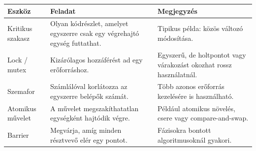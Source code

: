
\begin{tabularx}{\textwidth}{L{30mm}X X}
\toprule
\textbf{Eszköz} & \textbf{Feladat} & \textbf{Megjegyzés} \\
\midrule
Kritikus szakasz & Olyan kódrészlet, amelyet egyszerre csak egy végrehajtó egység futtathat. & Tipikus példa: közös változó módosítása. \\
Lock / mutex & Kizárólagos hozzáférést ad egy erőforráshoz. & Egyszerű, de holtpontot vagy várakozást okozhat rossz használatnál. \\
Szemafor & Számlálóval korlátozza az egyszerre belépők számát. & Több azonos erőforrás kezelésére is használható. \\
Atomikus művelet & A művelet megszakíthatatlan egységként hajtódik végre. & Például atomikus növelés, csere vagy compare-and-swap. \\
Barrier & Megvárja, amíg minden résztvevő elér egy pontot. & Fázisokra bontott algoritmusoknál gyakori. \\
\bottomrule
\end{tabularx}
